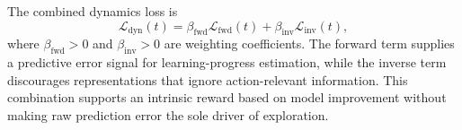The combined dynamics loss is
\begin{equation}
    \mathcal{L}_{\mathrm{dyn}}(t)
    = \beta_{\mathrm{fwd}}\mathcal{L}_{\mathrm{fwd}}(t)
    + \beta_{\mathrm{inv}}\mathcal{L}_{\mathrm{inv}}(t),
    \label{eq:dynamics_loss}
\end{equation}
where $\beta_{\mathrm{fwd}}>0$ and $\beta_{\mathrm{inv}}>0$ are weighting coefficients.
The forward term supplies a predictive error signal for learning-progress estimation, while the inverse term discourages representations that ignore action-relevant information.
This combination supports an intrinsic reward based on model improvement without making raw prediction error the sole driver of exploration.